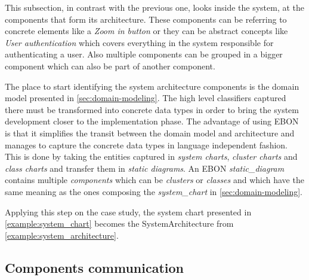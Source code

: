 \documentclass[conference]{IEEEtran}
\begin{document}
This subsection, in contrast with the previous one, looks inside the
system, at the components that form its architecture. These components
can be referring to concrete elements like a \emph{Zoom in button} or
they can be abstract concepts like \emph{User authentication} which
covers everything in the system responsible for authenticating a user.
Also multiple components can be grouped in a bigger component which
can also be part of another component.

The place to start identifying the system architecture components is
the domain model presented in \autoref{sec:domain-modeling}. The high
level classifiers captured there must be transformed into concrete
data types in order to bring the system development closer to the
implementation phase. The advantage of using EBON is that it
simplifies the transit between the domain model and architecture
and manages to capture the concrete data types in language
independent fashion. This is done by taking the entities captured in
\emph{system charts}, \emph{cluster charts} and \emph{class charts} and
transfer them in \emph{static diagrams}. An EBON \emph{static\_diagram}
contains multiple \emph{components} which can be \emph{clusters} or
\emph{classes} and which have the same meaning as the ones composing the
\emph{system\_chart} in \autoref{sec:domain-modeling}.



Applying this step on the case study, the system chart presented in
\autoref{example:system_chart} becomes the SystemArchitecture from
\autoref{example:system_architecture}.
%
\subsection{Components communication}
\label{sec:comp-comm}
\end{document}
